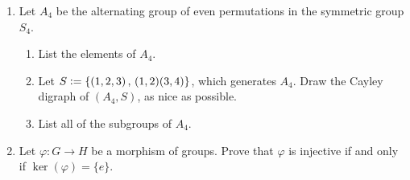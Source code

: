\documentclass[12pt]{article}
\begin{document}
\begin{enumerate}
  Generalize this to $D_n$ (e.g.\ for $n>2$, describe the Cayley graph).

\item
  Let $A_4$ be the alternating group of even permutations in the symmetric group $S_4$.
  \begin{enumerate}
   \item List the elements of $A_4$.
   \item Let $S\vcentcolon=\{(1,2,3)\,,\, (1,2)(3,4) \}$, which generates $A_4$.
        Draw the Cayley digraph of $(A_4, S)$, as nice as possible.
   \item List all of the subgroups of $A_4$.
  \end{enumerate}

\item
  Let $\varphi\colon G\to H$ be a morphism of groups.                    %
  Prove that $\varphi$ is injective if and only if $\ker(\varphi)=\{e\}$.

\end{enumerate}
\end{document}
